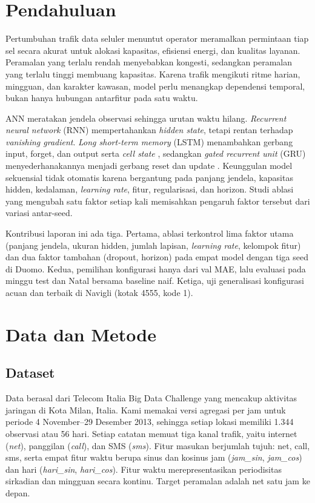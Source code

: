 \documentclass[conference,a4paper]{IEEEtran}
\begin{document}
\section{Pendahuluan}

Pertumbuhan trafik data seluler menuntut operator meramalkan permintaan tiap sel secara akurat untuk alokasi kapasitas, efisiensi energi, dan kualitas layanan. Peramalan yang terlalu rendah menyebabkan kongesti, sedangkan peramalan yang terlalu tinggi membuang kapasitas. Karena trafik mengikuti ritme harian, mingguan, dan karakter kawasan, model perlu menangkap dependensi temporal, bukan hanya hubungan antarfitur pada satu waktu.

ANN meratakan jendela observasi sehingga urutan waktu hilang. \textit{Recurrent neural network} (RNN) mempertahankan \textit{hidden state}, tetapi rentan terhadap \textit{vanishing gradient}. \textit{Long short-term memory} (LSTM) menambahkan gerbang input, forget, dan output serta \textit{cell state} \cite{hochreiter1997lstm}, sedangkan \textit{gated recurrent unit} (GRU) menyederhanakannya menjadi gerbang reset dan update \cite{cho2014gru}. Keunggulan model sekuensial tidak otomatis karena bergantung pada panjang jendela, kapasitas hidden, kedalaman, \textit{learning rate}, fitur, regularisasi, dan horizon. Studi ablasi yang mengubah satu faktor setiap kali memisahkan pengaruh faktor tersebut dari variasi antar-seed.

Kontribusi laporan ini ada tiga. Pertama, ablasi terkontrol lima faktor utama (panjang jendela, ukuran hidden, jumlah lapisan, \textit{learning rate}, kelompok fitur) dan dua faktor tambahan (dropout, horizon) pada empat model dengan tiga seed di Duomo. Kedua, pemilihan konfigurasi hanya dari val MAE, lalu evaluasi pada minggu test dan Natal bersama baseline naif. Ketiga, uji generalisasi konfigurasi acuan dan terbaik di Navigli (kotak 4555, kode 1).

\section{Data dan Metode}

\subsection{Dataset}

Data berasal dari Telecom Italia Big Data Challenge \cite{barlacchi2015milan} yang mencakup aktivitas jaringan di Kota Milan, Italia. Kami memakai versi agregasi per jam \cite{zhang2021fedda} untuk periode 4 November--29 Desember 2013, sehingga setiap lokasi memiliki 1.344 observasi atau 56 hari. Setiap catatan memuat tiga kanal trafik, yaitu internet (\textit{net}), panggilan (\textit{call}), dan SMS (\textit{sms}). Fitur masukan berjumlah tujuh: net, call, sms, serta empat fitur waktu berupa sinus dan kosinus jam (\textit{jam\_sin}, \textit{jam\_cos}) dan hari (\textit{hari\_sin}, \textit{hari\_cos}). Fitur waktu merepresentasikan periodisitas sirkadian dan mingguan secara kontinu. Target peramalan adalah net satu jam ke depan.
\end{document}
